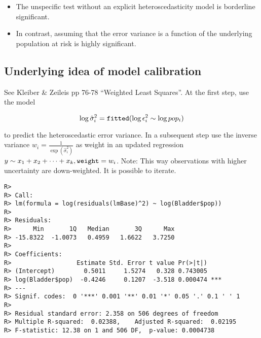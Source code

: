\documentclass[
]{article}
\newenvironment{Shaded}{\begin{snugshade}}{\end{snugshade}}
\newcommand{\DecValTok}[1]{\textcolor[rgb]{0.00,0.00,0.81}{#1}}
\newcommand{\KeywordTok}[1]{\textcolor[rgb]{0.13,0.29,0.53}{\textbf{#1}}}
\newcommand{\NormalTok}[1]{#1}
\newcommand{\OperatorTok}[1]{\textcolor[rgb]{0.81,0.36,0.00}{\textbf{#1}}}
\newcommand{\StringTok}[1]{\textcolor[rgb]{0.31,0.60,0.02}{#1}}
\begin{document}
\begin{itemize}
\item
  The unspecific test without an explicit heteroscedasticity model is
  borderline significant.
\item
  In contrast, assuming that the error variance is a function of the
  underlying population at risk is highly significant.
\end{itemize}

\hypertarget{underlying-idea-of-model-calibration}{%
\subsection{Underlying idea of model
calibration}\label{underlying-idea-of-model-calibration}}

See Kleiber \& Zeileis pp 76-78 ``Weighted Least Squares''. At the first
step, use the model

\[
 \log{\hat{\sigma}_i^2}={\tt fitted}(\log{\epsilon_i^2} \sim \log pop_i) 
\]

to predict the heteroscedastic error variance. In a subsequent step use
the inverse variance \(w_i=\frac{1}{\exp(\hat{\sigma}_i^2)}\) as weight
in an updated regression
\(y \sim x_1+x_2+ \cdots +x_k, {\tt weight}=w_i\). Note: This way
observations with higher uncertainty are down-weighted. It is possible
to iterate.

\begin{Shaded}
\end{Shaded}

\begin{verbatim}
R> 
R> Call:
R> lm(formula = log(residuals(lmBase)^2) ~ log(Bladder$pop))
R> 
R> Residuals:
R>      Min       1Q   Median       3Q      Max 
R> -15.8322  -1.0073   0.4959   1.6622   3.7250 
R> 
R> Coefficients:
R>                  Estimate Std. Error t value Pr(>|t|)    
R> (Intercept)        0.5011     1.5274   0.328 0.743005    
R> log(Bladder$pop)  -0.4246     0.1207  -3.518 0.000474 ***
R> ---
R> Signif. codes:  0 '***' 0.001 '**' 0.01 '*' 0.05 '.' 0.1 ' ' 1
R> 
R> Residual standard error: 2.358 on 506 degrees of freedom
R> Multiple R-squared:  0.02388,    Adjusted R-squared:  0.02195 
R> F-statistic: 12.38 on 1 and 506 DF,  p-value: 0.0004738
\end{verbatim}
\end{document}
